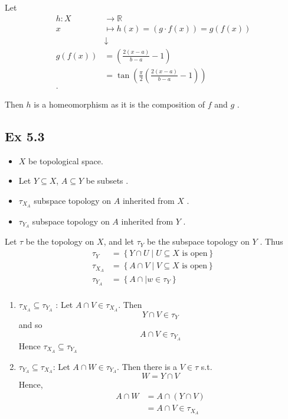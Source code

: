 \documentclass{article}
\theoremstyle{remark}
\begin{document}
Let \begin{align*}
    h: X &\longrightarrow \mathbb{R}  \\
    x &\longmapsto h(x) = \left( g \cdot f\left( x \right) \right) = g\left( f\left( x \right) \right) \\
 &  \downarrow \\
    g\left( f\left( x \right) \right) &=  \left( \frac{2\left( x-a \right)}{b-a} -1  \right)  \\
    &= \tan \left( \frac{\pi }{2} \left( \frac{2\left( x-a \right)}{b-a} -1 \right) \right) \\
.\end{align*}

Then $h$  is a homeomorphism as it is the composition of $f$  and $g$ .


\subsection*{Ex 5.3}%
\label{ssub:5_3}

\begin{itemize}
    \item $X$  be topological space.
    \item Let $Y \subseteq X$,    $A \subseteq Y$  be subsets .
    \item
 $\tau _{X_{A}} $  subspace topology on $A$  inherited from $X$ .
\item  $\tau _{Y_{A}}$ subspace topology on $A$  inherited from $Y$ .
\end{itemize}

Let $\tau $  be the topology on $X$, and let $\tau _{Y}$  be the subspace topology on $Y$ . Thus \[
\begin{split}
   \tau_{Y} &=  \left\{ Y \cap U  \mid U \subseteq X \text{ is open}   \right\}\\
   \tau _{X_{A}} &=  \left\{ A \cap V  \mid V \subseteq X \text{ is open} \right\} \\
   \tau _{Y_{A}}  &  = \left\{ A \cap  \mid w \in \tau _{Y} \right\} \\
\end{split}
\]

\begin{enumerate}[label=(\roman*)]
    \item $\tau _{X_{A}} \subseteq  \tau _{Y_{A}}$ : Let $A\cap V \in \tau _{X_{A}} $. Then \[
    Y \cap V \in \tau _{Y}
    \]
    and so \[
    A \cap V \in \tau _{Y_{A}}
    \]
    Hence  $\tau _{X_{A}} \subseteq  \tau _{Y_{A}}$

\item $\tau _{Y_{A}}  \subseteq  \tau_{X_{A}}  $: Let $A \cap W \in \tau _{Y_{A}}$. Then there is a $V \in \tau $ s.t.
   \[
   W = Y \cap V
   \]
   Hence, \[
       \begin{split}
       A \cap  W &= A \cap \left( Y \cap V \right) \\
       &= A \cap V \in \tau _{X_{A}} \\
       \end{split}
   \]
\end{enumerate}
\end{document}
